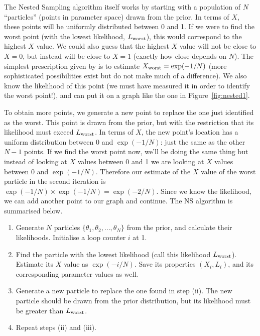 The Nested Sampling algorithm itself works by starting with a population
of $N$ ``particles'' (points in parameter space) drawn from the prior. In
terms of $X$, these points will be uniformly distributed between 0 and 1.
If we were to find the worst point (with the lowest likelihood, $L_{\rm worst}$), this would
correspond to the highest $X$ value. We could also guess that the highest
$X$ value will not be close to $X=0$, but instead will be close to $X=1$
(exactly how close depends on $N$). The simplest prescription given by
\citet{skilling} is to estimate $X_{\rm worst} = \exp(-1/N)$
(more sophisticated possibilities exist but do not make much of a difference).
We also know the likelihood of this point (we must have measured it in order
to identify the worst point!), and can put it on a graph like the one in
Figure~\ref{fig:nested1}.

To obtain more points, we generate a new point to replace the one just identified
as the worst. This point is drawn from the prior, but with the restriction that
its likelihood must exceed $L_{\rm worst}$. In terms of $X$, the new point's
location has a uniform distribution between 0 and $\exp(-1/N)$: just the same
as the other $N-1$ points. If we find the worst point now, we'll be doing the
same thing but instead of looking at $X$ values between 0 and 1 we are looking
at $X$ values between 0 and $\exp(-1/N)$. Therefore our estimate of the $X$
value of the worst particle in the second iteration is
$\exp(-1/N)\times\exp(-1/N) = \exp(-2/N)$. Since we know the likelihood, we
can add another point to our graph and continue. The NS algorithm is summarised
below.

\begin{enumerate}
\item Generate $N$ particles $\{\theta_1, \theta_2, ..., \theta_N\}$ from
the prior, and calculate their likelihoods. Initialise a loop counter $i$ at
1.
\item Find the particle with the lowest likelihood (call this likelihood $L_{\rm worst}$).
Estimate its $X$ value as
$\exp(-i/N)$. Save its properties $(X_i, L_i)$, and its corresponding
parameter values as well.
\item Generate a new particle to replace the one found in step (ii). The new
particle should be drawn from the prior distribution, but its likelihood
must be greater than $L_{\rm worst}$.
\item Repeat steps (ii) and (iii).
\end{enumerate}

